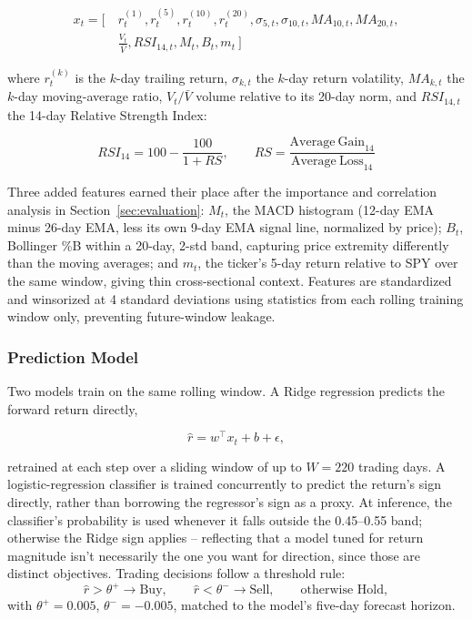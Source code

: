 \documentclass[conference]{IEEEtran}
\begin{document}
\begin{equation}
\begin{aligned}
x_t = \big[\ &r_t^{(1)}, r_t^{(5)}, r_t^{(10)}, r_t^{(20)}, \sigma_{5,t}, \sigma_{10,t}, MA_{10,t}, MA_{20,t}, \\
&\textstyle\frac{V_t}{\bar{V}}, RSI_{14,t}, M_t, B_t, m_t\ \big]
\end{aligned}
\end{equation}

where $r_t^{(k)}$ is the $k$-day trailing return, $\sigma_{k,t}$ the $k$-day return volatility, $MA_{k,t}$ the $k$-day moving-average ratio, $V_t/\bar V$ volume relative to its 20-day norm, and $RSI_{14,t}$ the 14-day Relative Strength Index:

\begin{equation}
RSI_{14} = 100 - \frac{100}{1 + RS}, \qquad RS = \frac{\mathrm{Average\ Gain}_{14}}{\mathrm{Average\ Loss}_{14}}
\end{equation}

Three added features earned their place after the importance and correlation analysis in Section~\ref{sec:evaluation}: $M_t$, the MACD histogram (12-day EMA minus 26-day EMA, less its own 9-day EMA signal line, normalized by price); $B_t$, Bollinger \%B within a 20-day, 2-std band, capturing price extremity differently than the moving averages; and $m_t$, the ticker's 5-day return relative to SPY over the same window, giving thin cross-sectional context. Features are standardized and winsorized at 4 standard deviations using statistics from each rolling training window only, preventing future-window leakage.

\subsubsection{Prediction Model}

Two models train on the same rolling window. A Ridge regression predicts the forward return directly,

\begin{equation}
\hat{r} = w^\top x_t + b + \epsilon,
\end{equation}

retrained at each step over a sliding window of up to $W = 220$ trading days. A logistic-regression classifier is trained concurrently to predict the return's sign directly, rather than borrowing the regressor's sign as a proxy. At inference, the classifier's probability is used whenever it falls outside the 0.45--0.55 band; otherwise the Ridge sign applies -- reflecting that a model tuned for return magnitude isn't necessarily the one you want for direction, since those are distinct objectives. Trading decisions follow a threshold rule:
\[
\hat{r} > \theta^{+} \rightarrow \text{Buy}, \qquad
\hat{r} < \theta^{-} \rightarrow \text{Sell}, \qquad
\text{otherwise Hold},
\]
with $\theta^{+} = 0.005$, $\theta^{-} = -0.005$, matched to the model's five-day forecast horizon.
\end{document}
